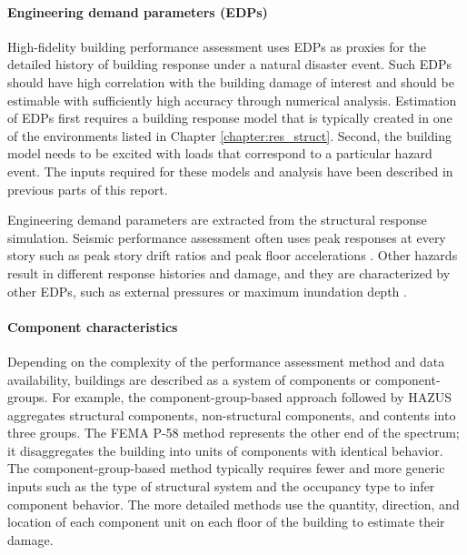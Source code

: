 \paragraph{Engineering demand parameters (EDPs)} High-fidelity building performance assessment uses EDPs as proxies for the detailed history of building response under a natural disaster event. Such EDPs should have high correlation with the building damage of interest and should be estimable with sufficiently high accuracy through numerical analysis. Estimation of EDPs first requires a building response model that is typically created in one of the environments listed in Chapter \ref{chapter:res_struct}. Second, the building model needs to be excited with loads that correspond to a particular hazard event. The inputs required for these models and analysis have been described in previous parts of this report.

Engineering demand parameters are extracted from the structural response simulation. Seismic performance assessment often uses peak responses at every story such as peak story drift ratios and peak floor accelerations \citep{atc2018p-58-1}. Other hazards result in different response histories and damage, and they are characterized by other EDPs, such as external pressures \citep{ouyang2020performance} or maximum inundation depth \citep{reese2011empirical}. 

\paragraph{Component characteristics} Depending on the complexity of the performance assessment method and data availability, buildings are described as a system of components or component-groups. For example, the component-group-based approach followed by HAZUS \citep{fema2011earthquaketechnical} aggregates structural components, non-structural components, and contents into three groups. The FEMA P-58 method represents the other end of the spectrum; it disaggregates the building into units of components with identical behavior. The component-group-based method typically requires fewer and more generic inputs such as the type of structural system and the occupancy type to infer component behavior. The more detailed methods use the quantity, direction, and location of each component unit on each floor of the building to estimate their damage.

